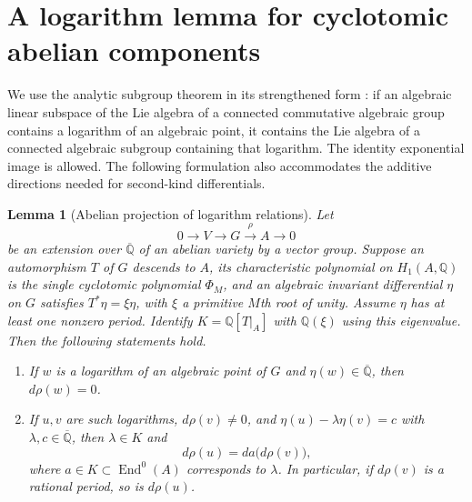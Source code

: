 \documentclass[11pt,a4paper]{article}
\newtheorem{lemma}[theorem]{Lemma}
\theoremstyle{definition}
\theoremstyle{remark}
\numberwithin{equation}{section}
\begin{document}
\section{A logarithm lemma for cyclotomic abelian components}
\label{beta-sec-loglemma}

We use the analytic subgroup theorem in its strengthened form
\cite[Theorem~6.2]{dbkz-hw}: if an algebraic linear subspace of the Lie
algebra of a connected commutative algebraic group contains a logarithm
of an algebraic point, it contains the Lie algebra of a connected
algebraic subgroup containing that logarithm.  The identity exponential
image is allowed.  The following formulation also accommodates the
additive directions needed for second-kind differentials.

\begin{lemma}[Abelian projection of logarithm relations]
\label{beta-lem-affine-log}
Let
\[
0\longrightarrow V\longrightarrow G\xrightarrow{\rho}A\longrightarrow0
\]
be an extension over $\overline{\mathbb Q}$ of an abelian variety by a
vector group.  Suppose an automorphism $T$ of $G$ descends to $A$, its
characteristic polynomial on $H_1(A,\mathbb Q)$ is the single
cyclotomic polynomial $\Phi_M$, and an algebraic invariant differential
$\eta$ on $G$ satisfies $T^*\eta=\xi\eta$, with $\xi$ a primitive
$M$th root of unity.  Assume $\eta$ has at least one nonzero period.
Identify $K=\mathbb Q[T|_A]$ with $\mathbb Q(\xi)$ using this eigenvalue.
Then the following statements hold.
\begin{enumerate}
\item If $w$ is a logarithm of an algebraic point of $G$ and
$\eta(w)\in\overline{\mathbb Q}$, then $d\rho(w)=0$.
\item If $u,v$ are such logarithms, $d\rho(v)\ne0$, and
$\eta(u)-\lambda\eta(v)=c$ with $\lambda,c\in\overline{\mathbb Q}$,
then $\lambda\in K$ and
\[
d\rho(u)=da\bigl(d\rho(v)\bigr),
\]
where $a\in K\subset\operatorname{End}^0(A)$ corresponds to $\lambda$.
In particular, if $d\rho(v)$ is a rational period, so is $d\rho(u)$.
\end{enumerate}
\end{lemma}
\end{document}
